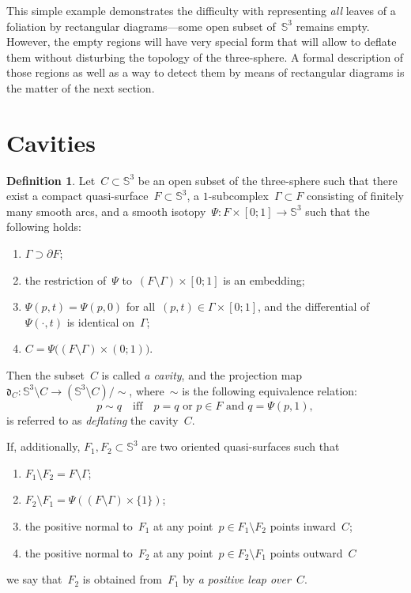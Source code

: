 \documentclass{amsart}
\theoremstyle{theorem}
\theoremstyle{remark}
\theoremstyle{definition}
\newtheorem{defi}[theo]{Definition}
\numberwithin{equation}{section}
\numberwithin{figure}{section}
\begin{document}
This simple example demonstrates the difficulty with representing \emph{all} leaves of a foliation by rectangular diagrams---some
open subset of~$\mathbb S^3$ remains empty. However, the empty regions will have very special form that will allow
to deflate them without disturbing the topology of the three-sphere. A formal description
of those regions as well as a way to detect them by means of rectangular diagrams is the matter of the next section.

\section{Cavities}\label{cavit-sec}

\begin{defi}\label{cavity-def}
Let~$C\subset\mathbb S^3$ be an open subset of the three-sphere such that there exist a compact quasi-surface~$F\subset\mathbb S^3$,
a $1$-subcomplex~$\Gamma\subset F$ consisting of finitely many smooth arcs,
and a smooth isotopy~$\Psi:F\times[0;1]\rightarrow\mathbb S^3$ such that the following holds:
\begin{enumerate}
\item
$\Gamma\supset\partial F$;
\item
the restriction of~$\Psi$ to~$(F\setminus\Gamma)\times[0;1]$ is an embedding;
\item
$\Psi(p,t)=\Psi(p,0)$ for all~$(p,t)\in\Gamma\times[0;1]$, and the differential of~$\Psi(\cdot,t)$ is identical on~$\Gamma$;
\item
$C=\Psi\bigl((F\setminus\Gamma)\times(0;1)\bigr)$.
\end{enumerate}
Then the subset~$C$ is called \emph{a cavity}, and the projection map~$\mathfrak d_C:\mathbb S^3\setminus C\rightarrow(\mathbb S^3\setminus C)/{\sim}$,
where~$\sim$ is the following equivalence relation:
$$p\sim q\quad\text{iff}\quad p=q\text{ or }p\in F\text{ and }q=\Psi(p,1),$$
is referred to as \emph{deflating} the cavity~$C$.

If, additionally, $F_1,F_2\subset\mathbb S^3$ are two oriented quasi-surfaces such that
\begin{enumerate}
\item
$F_1\setminus F_2=F\setminus\Gamma$;
\item
$F_2\setminus F_1=\Psi((F\setminus\Gamma)\times\{1\})$;
\item
the positive normal to~$F_1$ at any point~$p\in F_1\setminus F_2$ points inward~$C$;
\item
the positive normal to~$F_2$ at any point~$p\in F_2\setminus F_1$ points outward~$C$
\end{enumerate}
we say that~$F_2$ is obtained from~$F_1$ by \emph{a positive leap over~$C$}.
\end{defi}
\end{document}
